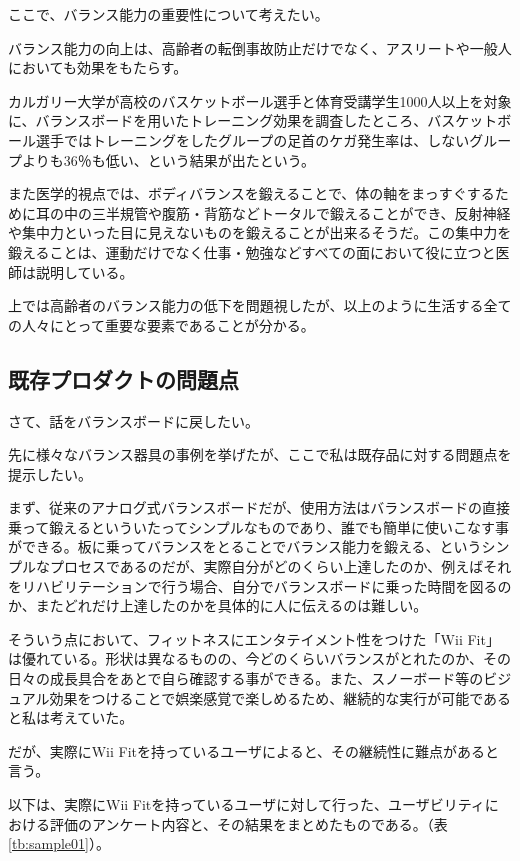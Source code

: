 ここで、バランス能力の重要性について考えたい。

バランス能力の向上は、高齢者の転倒事故防止だけでなく、アスリートや一般人においても効果をもたらす。

カルガリー大学が高校のバスケットボール選手と体育受講学生1000人以上を対象に、バランスボードを用いたトレーニング効果を調査したところ、バスケットボール選手ではトレーニングをしたグループの足首のケガ発生率は、しないグループよりも36％も低い、という結果が出たという。\cite{hoge09}

また医学的視点では、ボディバランスを鍛えることで、体の軸をまっすぐするために耳の中の三半規管や腹筋・背筋などトータルで鍛えることができ、反射神経や集中力といった目に見えないものを鍛えることが出来るそうだ。この集中力を鍛えることは、運動だけでなく仕事・勉強などすべての面において役に立つと医師は説明している。\cite{hoge10}

上では高齢者のバランス能力の低下を問題視したが、以上のように生活する全ての人々にとって重要な要素であることが分かる。




\subsection{既存プロダクトの問題点}

さて、話をバランスボードに戻したい。

先に様々なバランス器具の事例を挙げたが、ここで私は既存品に対する問題点を提示したい。

まず、従来のアナログ式バランスボードだが、使用方法はバランスボードの直接乗って鍛えるといういたってシンプルなものであり、誰でも簡単に使いこなす事ができる。板に乗ってバランスをとることでバランス能力を鍛える、というシンプルなプロセスであるのだが、実際自分がどのくらい上達したのか、例えばそれをリハビリテーションで行う場合、自分でバランスボードに乗った時間を図るのか、またどれだけ上達したのかを具体的に人に伝えるのは難しい。

そういう点において、フィットネスにエンタテイメント性をつけた「Wii Fit」は優れている。形状は異なるものの、今どのくらいバランスがとれたのか、その日々の成長具合をあとで自ら確認する事ができる。また、スノーボード等のビジュアル効果をつけることで娯楽感覚で楽しめるため、継続的な実行が可能であると私は考えていた。

だが、実際にWii Fitを持っているユーザによると、その継続性に難点があると言う。

以下は、実際にWii Fitを持っているユーザに対して行った、ユーザビリティにおける評価のアンケート内容と、その結果をまとめたものである。（表\ref{tb:sample01}）。

